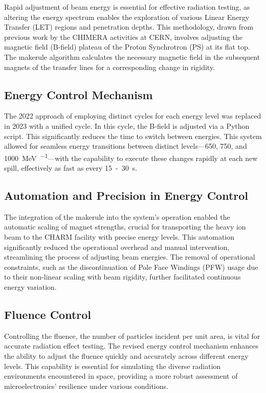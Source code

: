 \documentclass[a4paper,
               ]{jacow}
\begin{document}
Rapid adjustment of beam energy is essential for effective radiation testing, as altering the energy spectrum enables the exploration of various Linear Energy Transfer (LET) regions and penetration depths. This methodology, drawn from previous work by the CHIMERA activities at CERN, involves adjusting the magnetic field (B-field) plateau of the Proton Synchrotron (PS) at its flat top. The makerule algorithm calculates the necessary magnetic field in the subsequent magnets of the transfer lines for a corresponding change in rigidity.

\subsection{Energy Control Mechanism}
The 2022 approach of employing distinct cycles for each energy level was replaced in 2023 with a unified cycle. In this cycle, the B-field is adjusted via a Python script. This significantly reduces the time to switch between energies. This system allowed for seamless energy transitions between distinct levels—\SI{650}{}, \SI{750}{}, and \SI{1000}{\mega\electronvolt\per\nucleon}—with the capability to execute these changes rapidly at each new spill, effectively as fast as every \SI{15}-\SI{30}{\second}.

\subsection{Automation and Precision in Energy Control}
The integration of the makerule into the system's operation enabled the automatic scaling of magnet strengths, crucial for transporting the heavy ion beam to the CHARM facility with precise energy levels. This automation significantly reduced the operational overhead and manual intervention, streamlining the process of adjusting beam energies. The removal of operational constraints, such as the discontinuation of Pole Face Windings (PFW) usage due to their non-linear scaling with beam rigidity, further facilitated continuous energy variation.

\subsection{Fluence Control}
Controlling the fluence, the number of particles incident per unit area, is vital for accurate radiation effect testing. The revised energy control mechanism enhances the ability to adjust the fluence quickly and accurately across different energy levels. This capability is essential for simulating the diverse radiation environments encountered in space, providing a more robust assessment of microelectronics' resilience under various conditions.
\end{document}
